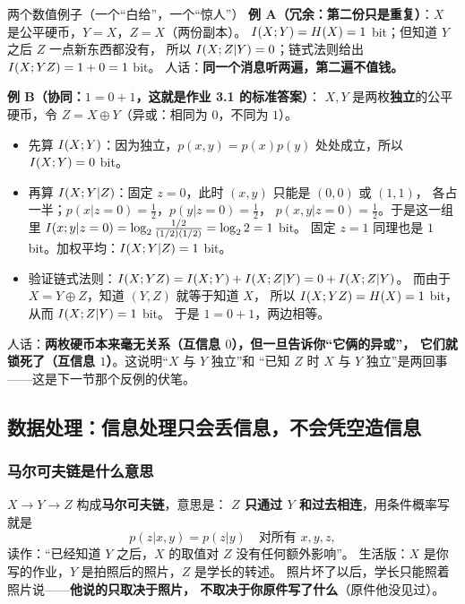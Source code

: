 \begin{calc}{两个数值例子（一个“白给”，一个“惊人”）}
\textbf{例 A（冗余：第二份只是重复）}：$X$ 是公平硬币，$Y=X$，$Z=X$（两份副本）。
$I\!\left(X;Y\right)=H\!\left(X\right)=1$ bit；但知道 $Y$ 之后 $Z$ 一点新东西都没有，
所以 $I\!\left(X;Z|Y\right)=0$；链式法则给出 $I\!\left(X;YZ\right)=1+0=1$ bit。
人话：\textbf{同一个消息听两遍，第二遍不值钱。}

\textbf{例 B（协同：$1=0+1$，这就是作业 3.1 的标准答案）}：
$X,Y$ 是两枚\textbf{独立}的公平硬币，令 $Z=X\oplus Y$（异或：相同为 $0$，不同为 $1$）。
\begin{itemize}[leftmargin=1.4em,itemsep=1pt,topsep=1pt]
  \item 先算 $I\!\left(X;Y\right)$：因为独立，$p(x,y)=p(x)p(y)$ 处处成立，所以 $I\!\left(X;Y\right)=0$ bit。
  \item 再算 $I\!\left(X;Y|Z\right)$：固定 $z=0$，此时 $(x,y)$ 只能是 $(0,0)$ 或 $(1,1)$，
        各占一半；$p(x|z=0)=\tfrac12$，$p(y|z=0)=\tfrac12$，
        $p(x,y|z=0)=\tfrac12$。于是这一组里
        $I\!\left(x;y|z=0\right)=\log_{2}\frac{1/2}{(1/2)(1/2)}=\log_{2}2=1$ bit。
        固定 $z=1$ 同理也是 $1$ bit。加权平均：$I\!\left(X;Y|Z\right)=1$ bit。
  \item 验证链式法则：$I\!\left(X;YZ\right)=I\!\left(X;Y\right)+I\!\left(X;Z|Y\right)=0+I\!\left(X;Z|Y\right)$。
        而由于 $X=Y\oplus Z$，知道 $(Y,Z)$ 就等于知道 $X$，
        所以 $I\!\left(X;YZ\right)=H\!\left(X\right)=1$ bit，从而 $I\!\left(X;Z|Y\right)=1$ bit。
        于是 $1=0+1$，两边相等。
\end{itemize}
人话：\textbf{两枚硬币本来毫无关系（互信息 $0$），但一旦告诉你“它俩的异或”，
它们就锁死了（互信息 $1$）}。这说明“$X$ 与 $Y$ 独立”和
“已知 $Z$ 时 $X$ 与 $Y$ 独立”是两回事——这是下一节那个反例的伏笔。
\end{calc}

\subsection{数据处理：信息处理只会丢信息，不会凭空造信息}

\subsubsection{马尔可夫链是什么意思}

$X\to Y\to Z$ 构成\textbf{马尔可夫链}，意思是：
\textbf{$Z$ 只通过 $Y$ 和过去相连}，用条件概率写就是
\[
p(z|x,y)=p(z|y)\quad\text{对所有 }x,y,z ,
\]
读作：“已经知道 $Y$ 之后，$X$ 的取值对 $Z$ 没有任何额外影响”。
生活版：$X$ 是你写的作业，$Y$ 是拍照后的照片，$Z$ 是学长的转述。
照片坏了以后，学长只能照着照片说——\textbf{他说的只取决于照片，
不取决于你原件写了什么}（原件他没见过）。

